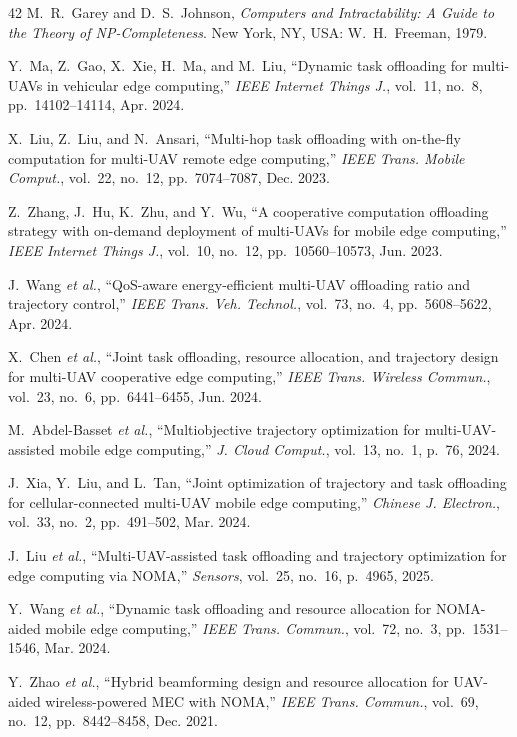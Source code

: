 \documentclass[journal]{IEEEtran}
\begin{document}
\begin{thebibliography}{42}
 M.~R.~Garey and D.~S.~Johnson, \emph{Computers and Intractability: A Guide to the Theory of NP-Completeness}. New York, NY, USA: W.~H.~Freeman, 1979.

 Y.~Ma, Z.~Gao, X.~Xie, H.~Ma, and M.~Liu, ``Dynamic task offloading for multi-UAVs in vehicular edge computing,'' \emph{IEEE Internet Things J.}, vol.~11, no.~8, pp.~14102--14114, Apr. 2024.

 X.~Liu, Z.~Liu, and N.~Ansari, ``Multi-hop task offloading with on-the-fly computation for multi-UAV remote edge computing,'' \emph{IEEE Trans. Mobile Comput.}, vol.~22, no.~12, pp.~7074--7087, Dec. 2023.

 Z.~Zhang, J.~Hu, K.~Zhu, and Y.~Wu, ``A cooperative computation offloading strategy with on-demand deployment of multi-UAVs for mobile edge computing,'' \emph{IEEE Internet Things J.}, vol.~10, no.~12, pp.~10560--10573, Jun. 2023.

 J.~Wang \emph{et al.}, ``QoS-aware energy-efficient multi-UAV offloading ratio and trajectory control,'' \emph{IEEE Trans. Veh. Technol.}, vol.~73, no.~4, pp.~5608--5622, Apr. 2024.

 X.~Chen \emph{et al.}, ``Joint task offloading, resource allocation, and trajectory design for multi-UAV cooperative edge computing,'' \emph{IEEE Trans. Wireless Commun.}, vol.~23, no.~6, pp.~6441--6455, Jun. 2024.

 M.~Abdel-Basset \emph{et al.}, ``Multiobjective trajectory optimization for multi-UAV-assisted mobile edge computing,'' \emph{J. Cloud Comput.}, vol.~13, no.~1, p.~76, 2024.

 J.~Xia, Y.~Liu, and L.~Tan, ``Joint optimization of trajectory and task offloading for cellular-connected multi-UAV mobile edge computing,'' \emph{Chinese J. Electron.}, vol.~33, no.~2, pp.~491--502, Mar. 2024.

 J.~Liu \emph{et al.}, ``Multi-UAV-assisted task offloading and trajectory optimization for edge computing via NOMA,'' \emph{Sensors}, vol.~25, no.~16, p.~4965, 2025.

 Y.~Wang \emph{et al.}, ``Dynamic task offloading and resource allocation for NOMA-aided mobile edge computing,'' \emph{IEEE Trans. Commun.}, vol.~72, no.~3, pp.~1531--1546, Mar. 2024.

 Y.~Zhao \emph{et al.}, ``Hybrid beamforming design and resource allocation for UAV-aided wireless-powered MEC with NOMA,'' \emph{IEEE Trans. Commun.}, vol.~69, no.~12, pp.~8442--8458, Dec. 2021.


\end{thebibliography}
\end{document}
